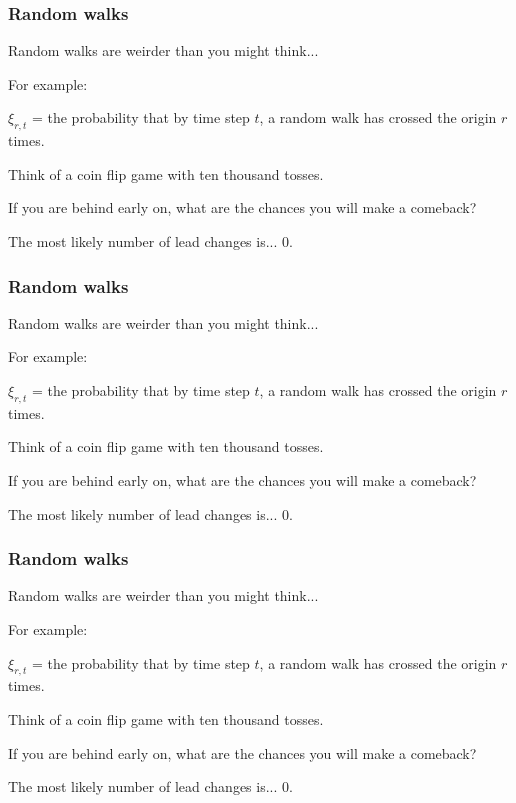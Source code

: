 \begin{frame}
  \frametitle{Random walks}

Random walks are weirder than you might think...

\inv

For example:

$\xi_{r,t}$ = the probability that by time step $t$,
a random walk has crossed the origin $r$ times.

Think of a coin flip game with ten thousand tosses.

If you are behind early on, what are the chances you
will make a comeback?

The most likely number of lead changes is...  
0.


\end{frame}

\begin{frame}
  \frametitle{Random walks}

Random walks are weirder than you might think...

For example:

$\xi_{r,t}$ = the probability that by time step $t$,
a random walk has crossed the origin $r$ times.

\inv

Think of a coin flip game with ten thousand tosses.

If you are behind early on, what are the chances you
will make a comeback?

The most likely number of lead changes is...  
0.



\end{frame}

\begin{frame}
  \frametitle{Random walks}

Random walks are weirder than you might think...

For example:

$\xi_{r,t}$ = the probability that by time step $t$,
a random walk has crossed the origin $r$ times.

Think of a coin flip game with ten thousand tosses.

If you are behind early on, what are the chances you
will make a comeback?

\inv 

The most likely number of lead changes is...  
0.


\end{frame}

